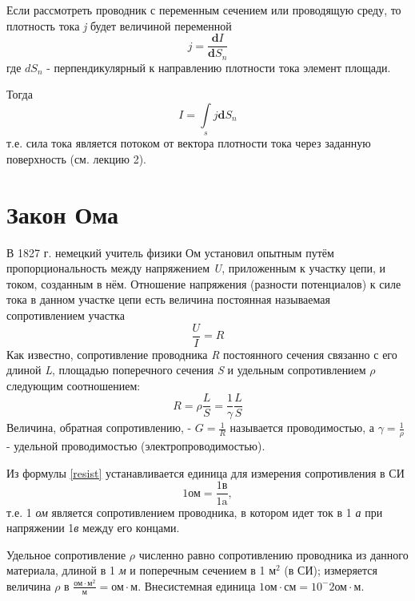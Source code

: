 \documentclass[a4paper,10pt]{book}
\begin{document}
Если рассмотреть проводник с переменным сечением или проводящую среду, то плотность тока \emph{j} будет величиной переменной
\begin{equation}\label{dencity}
 j = \frac{\mathbf{d}I}{\mathbf{d}S_n}
\end{equation}
где $dS_n$ - перпендикулярный к направлению плотности тока элемент площади.

Тогда
\begin{equation}\label{inti}
 I = \int\limits_{s}j\mathbf{d}S_n
\end{equation}
т.е. сила тока является потоком от вектора плотности тока через заданную поверхность (см. лекцию 2).
\section{Закон Ома}
В 1827 г. немецкий учитель физики Ом установил опытным путём пропорциональность между напряжением \emph{U}, приложенным 
к участку цепи, и током, созданным в нём. Отношение напряжения (разности потенциалов) к силе тока в данном участке цепи есть величина
постоянная называемая сопротивлением участка
\begin{equation}\label{resist}
 \frac{U}{I} = R
\end{equation}
Как известно, сопротивление проводника \emph{R} постоянного сечения связанно с его длиной \emph{L}, площадью поперечного сечения \emph{S}
и удельным сопротивлением $\rho$ следующим соотношением:
\begin{equation}\label{rls}
 R = \rho\frac{L}{S} = \frac{1}{\gamma}\frac{L}{S}
\end{equation}
Величина, обратная сопротивлению, - $G = \frac{1}{R}$ называется проводимостью, а $\gamma = \frac{1}{\rho}$ - удельной проводимостью
(электропроводимостью).

Из формулы \ref{resist} устанавливается единица для измерения сопротивления в СИ
\begin{equation}
 1 \text{ом} = \frac{1\text{в}}{1\text{a}},
\end{equation}
т.е. 1 \emph{ом} является сопротивлением проводника, в котором идет ток в 1 \emph{а} при напряжении 1\emph{в} между его концами.

Удельное сопротивление $\rho$ численно равно сопротивлению проводника из данного материала, длиной в 1 \emph{м} и поперечным сечением
в 1 $\text{м}^2$ (в СИ); измеряется величина $\rho$ в $\frac{\text{ом} \cdot \text{м}^2}{\text{м}} = \text{ом} \cdot \text{м}$.
Внесистемная единица $1 \text{ом} \cdot \text{см} = 10^-2 \text{ом} \cdot \text{м}$.
\end{document}
